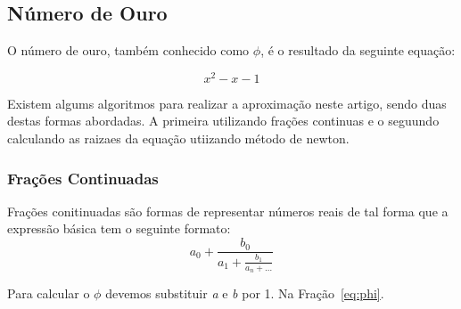 \subsection{Número de Ouro}

	O número de ouro, também conhecido como $\phi$, é o resultado da seguinte
	equação:

	\begin{equation}
		x^2-x-1
	\end{equation}

	Existem algums algoritmos para realizar a aproximação neste artigo, sendo
	duas destas formas  abordadas. A primeira utilizando frações continuas e o
	seguundo calculando as raizaes da equação utiizando método de newton.

\subsubsection{Frações Continuadas}

	Frações conitinuadas são formas de representar números reais de tal forma
	que a expressão básica tem o seguinte formato:
	\begin{equation}\label{eq:phi}
		a_0 + \frac{b_0}{a_1 + \frac{b_1}{a_n + \dots}}
	\end{equation}

	Para calcular o $\phi$ devemos substituir \emph{a} e \emph{b} por 1. Na
	Fração~\ref{eq:phi}.

